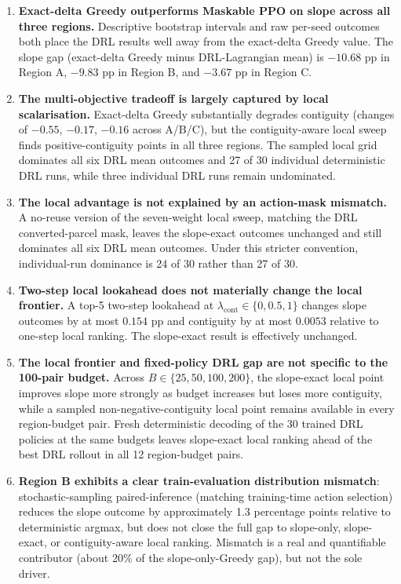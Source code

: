 \documentclass[]{interact}
\theoremstyle{plain}
\begin{document}
\begin{enumerate}
\item \textbf{Exact-delta Greedy outperforms Maskable PPO on slope across all three regions.} Descriptive bootstrap intervals and raw per-seed outcomes both place the DRL results well away from the exact-delta Greedy value. The slope gap (exact-delta Greedy minus DRL-Lagrangian mean) is $-10.68$ pp in Region A, $-9.83$ pp in Region B, and $-3.67$ pp in Region C.

\item \textbf{The multi-objective tradeoff is largely captured by local scalarisation.} Exact-delta Greedy substantially degrades contiguity (changes of $-0.55$, $-0.17$, $-0.16$ across A/B/C), but the contiguity-aware local sweep finds positive-contiguity points in all three regions. The sampled local grid dominates all six DRL mean outcomes and 27 of 30 individual deterministic DRL runs, while three individual DRL runs remain undominated.

\item \textbf{The local advantage is not explained by an action-mask mismatch.} A no-reuse version of the seven-weight local sweep, matching the DRL converted-parcel mask, leaves the slope-exact outcomes unchanged and still dominates all six DRL mean outcomes. Under this stricter convention, individual-run dominance is 24 of 30 rather than 27 of 30.

\item \textbf{Two-step local lookahead does not materially change the local frontier.} A top-5 two-step lookahead at $\lambda_{\mathrm{cont}}\in\{0,0.5,1\}$ changes slope outcomes by at most $0.154$ pp and contiguity by at most $0.0053$ relative to one-step local ranking. The slope-exact result is effectively unchanged.

\item \textbf{The local frontier and fixed-policy DRL gap are not specific to the 100-pair budget.} Across $B\in\{25,50,100,200\}$, the slope-exact local point improves slope more strongly as budget increases but loses more contiguity, while a sampled non-negative-contiguity local point remains available in every region-budget pair. Fresh deterministic decoding of the 30 trained DRL policies at the same budgets leaves slope-exact local ranking ahead of the best DRL rollout in all 12 region-budget pairs.

\item \textbf{Region B exhibits a clear train-evaluation distribution mismatch}: stochastic-sampling paired-inference (matching training-time action selection) reduces the slope outcome by approximately 1.3 percentage points relative to deterministic argmax, but does not close the full gap to slope-only, slope-exact, or contiguity-aware local ranking. Mismatch is a real and quantifiable contributor (about 20\% of the slope-only-Greedy gap), but not the sole driver.


\end{enumerate}
\end{document}
